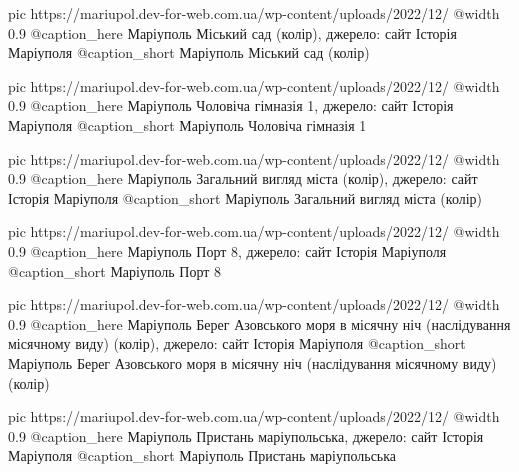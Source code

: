 	pic https://mariupol.dev-for-web.com.ua/wp-content/uploads/2022/12/%
	@width 0.9
	@caption_here Маріуполь Міський сад (колір), джерело: сайт Історія Маріуполя
	@caption_short Маріуполь Міський сад (колір)

	pic https://mariupol.dev-for-web.com.ua/wp-content/uploads/2022/12/%
	@width 0.9
	@caption_here Маріуполь Чоловіча гімназія 1, джерело: сайт Історія Маріуполя
	@caption_short Маріуполь Чоловіча гімназія 1

	pic https://mariupol.dev-for-web.com.ua/wp-content/uploads/2022/12/%
	@width 0.9
	@caption_here Маріуполь Загальний вигляд міста (колір), джерело: сайт Історія Маріуполя
	@caption_short Маріуполь Загальний вигляд міста (колір)

	pic https://mariupol.dev-for-web.com.ua/wp-content/uploads/2022/12/%
	@width 0.9
	@caption_here Маріуполь Порт 8, джерело: сайт Історія Маріуполя
	@caption_short Маріуполь Порт 8

	pic https://mariupol.dev-for-web.com.ua/wp-content/uploads/2022/12/%
	@width 0.9
	@caption_here Маріуполь Берег Азовського моря в місячну ніч (наслідування місячному виду) (колір), джерело: сайт Історія Маріуполя
	@caption_short Маріуполь Берег Азовського моря в місячну ніч (наслідування місячному виду) (колір)

	pic https://mariupol.dev-for-web.com.ua/wp-content/uploads/2022/12/%
	@width 0.9
	@caption_here Маріуполь Пристань маріупольська, джерело: сайт Історія Маріуполя
	@caption_short Маріуполь Пристань маріупольська

